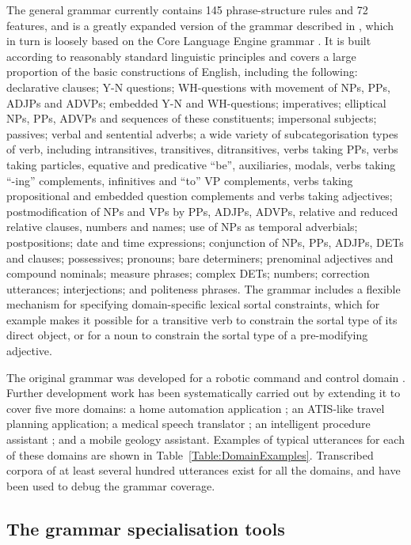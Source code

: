 \documentclass[11pt]{article}
\begin{document}
The general grammar currently contains 145 phrase-structure rules and
72 features, and is a greatly expanded version of the grammar
described in \cite{Coling2000}, which in turn is loosely based on the
Core Language Engine grammar \cite{Pulman92}. It is built according to
reasonably standard linguistic principles and covers a large
proportion of the basic constructions of English, including the
following: declarative clauses; Y-N questions; WH-questions with
movement of NPs, PPs, ADJPs and ADVPs; embedded Y-N and WH-questions;
imperatives; elliptical NPs, PPs, ADVPs and sequences of these
constituents; impersonal subjects; passives; verbal and sentential
adverbs; a wide variety of subcategorisation types of verb, including
intransitives, transitives, ditransitives, verbs taking PPs, verbs
taking particles, equative and predicative ``be'', auxiliaries,
modals, verbs taking ``-ing'' complements, infinitives and ``to'' VP
complements, verbs taking propositional and embedded question
complements and verbs taking adjectives; postmodification of NPs and
VPs by PPs, ADJPs, ADVPs, relative and reduced relative clauses,
numbers and names; use of NPs as temporal adverbials; postpositions;
date and time expressions; conjunction of NPs, PPs, ADJPs, DETs and
clauses; possessives; pronouns; bare determiners; prenominal adjectives
and compound nominals; measure phrases; complex DETs; numbers;
correction utterances; interjections; and politeness phrases.
The grammar includes a flexible mechanism for specifying domain-specific 
lexical sortal constraints, which for example makes it possible 
for a transitive verb to constrain the sortal type of its direct
object, or for a noun to constrain the sortal type of a pre-modifying
adjective.

The original grammar was developed for a robotic command and control
domain \cite{ANLP00}. Further development work has been systematically
carried out by extending it to cover five more domains: a home
automation application \cite{SIGDIAL2001}; an ATIS-like travel
planning application; a medical speech translator
\cite{RaynerBouillon2002}; an intelligent procedure assistant
\cite{Aist02}; and a mobile geology assistant. Examples of typical
utterances for each of these domains are shown in
Table~\ref{Table:DomainExamples}. Transcribed corpora of at least
several hundred utterances exist for all the domains,
and have been used to debug the grammar coverage.

\subsection{The grammar specialisation tools}
\label{Section:GrammarSpecialisation}
\end{document}

